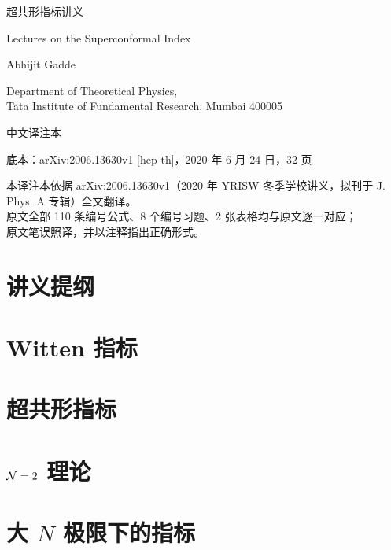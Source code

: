 \documentclass[UTF8,a4paper,11pt]{ctexart}
\begin{document}
\begin{titlepage}
\centering
\vspace*{3.0cm}
{\heiti{} 超共形指标讲义\par}
\vspace{1.0cm}
{\kaishu{} Lectures on the Superconformal Index\par}
\vspace{2.0cm}
{ Abhijit Gadde\par}
\vspace{0.5cm}
{ Department of Theoretical Physics,\\ Tata Institute of Fundamental Research, Mumbai 400005\par}
\vspace{2.0cm}
{\kaishu{} 中文译注本\par}
\vspace{0.8cm}
{ 底本：arXiv:2006.13630v1 [hep-th]，2020 年 6 月 24 日，32 页\par}
\vfill
{\kaishu{}
本译注本依据 arXiv:2006.13630v1（2020 年 YRISW 冬季学校讲义，拟刊于 J. Phys. A 专辑）全文翻译。\\
原文全部 110 条编号公式、8 个编号习题、2 张表格均与原文逐一对应；\\
原文笔误照译，并以注释指出正确形式。\par}
\vspace{1.0cm}
\end{titlepage}

\tableofcontents
\newpage





\setcounter{section}{-1}

\section{讲义提纲}


\section{Witten 指标}



\section{超共形指标}



\section{$\mathcal{N}=2$ 理论}



\section{大 $N$ 极限下的指标}



\end{document}
